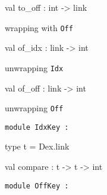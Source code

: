 \documentclass[11pt]{article}
\begin{document}
\label{val:Dex.to-underscoreoff}\begin{ocamldoccode}
val to_off : int -> link
\end{ocamldoccode}
\begin{ocamldocdescription}
wrapping with {\tt{Off}}


\end{ocamldocdescription}




\label{val:Dex.of-underscoreidx}\begin{ocamldoccode}
val of_idx : link -> int
\end{ocamldoccode}
\begin{ocamldocdescription}
unwrapping {\tt{Idx}}


\end{ocamldocdescription}




\label{val:Dex.of-underscoreoff}\begin{ocamldoccode}
val of_off : link -> int
\end{ocamldoccode}
\begin{ocamldocdescription}
unwrapping {\tt{Off}}


\end{ocamldocdescription}




\begin{ocamldoccode}
{\tt{module }}{\tt{IdxKey}}{\tt{ : }}\end{ocamldoccode}
\label{module:Dex.IdxKey}

\begin{ocamldocsigend}


\label{type:Dex.IdxKey.t}\begin{ocamldoccode}
type t = Dex.link 
\end{ocamldoccode}


\label{val:Dex.IdxKey.compare}\begin{ocamldoccode}
val compare : t -> t -> int
\end{ocamldoccode}
\end{ocamldocsigend}






\begin{ocamldoccode}
{\tt{module }}{\tt{OffKey}}{\tt{ : }}\end{ocamldoccode}
\label{module:Dex.OffKey}
\end{document}
